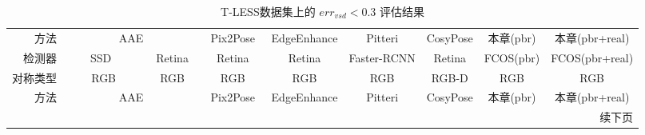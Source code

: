         {
        \scriptsize
        \begin{longtable}{r| c c c c c c c c}
        \caption{T-LESS数据集上的 $err_{vsd} < 0.3$ 评估结果} \label{tab:tless_vsd} \\
        \toprule
        方法& \multicolumn{2}{c}{AAE \cite{sundermeyer2018implicit}} & Pix2Pose \cite{park2019pix2pose}& EdgeEnhance \cite{wen2020edge}& Pitteri\cite{pitteri2019object} & CosyPose\cite{labbe2020cosypose}& 本章(pbr) & 本章(pbr+real)\\
        \cmidrule(lr){2-3}\cmidrule(lr){4-4}\cmidrule(lr){5-5}\cmidrule(lr){6-6}\cmidrule(lr){7-7}\cmidrule(lr){8-9}
        检测器&\ \ \ \ SSD\ \ \ \ \  &\ Retina\ &\ \ Retina\ \ &\ \ Retina\ \ & Faster-RCNN & Retina & FCOS(pbr) & FCOS(pbr+real)\\
        对称类型& RGB & RGB & RGB &RGB& RGB &RGB-D& RGB &RGB \\
        \midrule
        \endfirsthead

        \toprule
        方法 & \multicolumn{2}{c}{AAE \cite{sundermeyer2018implicit}} & Pix2Pose \cite{park2019pix2pose} & EdgeEnhance \cite{wen2020edge} & Pitteri \cite{pitteri2019object} & CosyPose \cite{labbe2020cosypose} &本章(pbr) & 本章(pbr+real) \\
        \midrule
        \endhead

        \midrule
        \multicolumn{9}{r}{续下页}
        \endfoot

        \bottomrule
        \endlastfoot


\end{longtable}}
